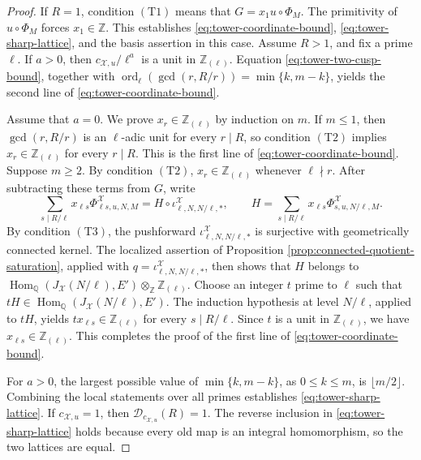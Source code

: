 \documentclass[12pt, letterpaper]{amsart}
\theoremstyle{definition}
\theoremstyle{remark}
\newcommand{\Q}{\mathbb Q}
\newcommand{\Z}{\mathbb Z}
\newcommand{\Hom}{\operatorname{Hom}}
\DeclareMathOperator{\ord}{ord}
\numberwithin{equation}{section}
\begin{document}
\begin{proof}
If \(R=1\), condition \hyperlink{tower-condition-T1}{\(\mathrm{(T1)}\)} means that \(G=x_1u\circ\Phi_M\). The
primitivity of \(u\circ\Phi_M\) forces \(x_1\in\Z\). This establishes
\eqref{eq:tower-coordinate-bound}, \eqref{eq:tower-sharp-lattice}, and the basis
assertion in this case. Assume \(R>1\), and fix a prime \(\ell\). If \(a>0\), then
\(c_{\mathcal X,u}/\ell^a\) is a unit in
\(\Z_{(\ell)}\). Equation \eqref{eq:tower-two-cusp-bound}, together with
\(\ord_\ell(\gcd(r,R/r))=\min\{k,m-k\}\), yields the second line of
\eqref{eq:tower-coordinate-bound}.

Assume that \(a=0\). We prove \(x_r\in\Z_{(\ell)}\) by induction on \(m\).
If \(m\le1\), then \(\gcd(r,R/r)\) is an \(\ell\)-adic unit for every
\(r\mid R\), so condition \hyperlink{tower-condition-T2}{\(\mathrm{(T2)}\)} implies
\(x_r\in\Z_{(\ell)}\) for every \(r\mid R\). This is the first line of
\eqref{eq:tower-coordinate-bound}. Suppose \(m\ge2\). By condition
\hyperlink{tower-condition-T2}{\(\mathrm{(T2)}\)},
\(x_r\in\Z_{(\ell)}\) whenever \(\ell\nmid r\). After subtracting these terms
from \(G\), write
\[
        \sum_{s\mid R/\ell}x_{\ell s}
        \Phi^{\mathcal X}_{\ell s,u,N,M}
        =
        H\circ\iota^{\mathcal X}_{\ell,N,N/\ell,*},
        \qquad
        H=
        \sum_{s\mid R/\ell}x_{\ell s}
        \Phi^{\mathcal X}_{s,u,N/\ell,M}.
\]
By condition \hyperlink{tower-condition-T3}{\(\mathrm{(T3)}\)}, the pushforward
\(\iota^{\mathcal X}_{\ell,N,N/\ell,*}\) is surjective with geometrically
connected kernel. The localized assertion of Proposition
\ref{prop:connected-quotient-saturation}, applied with
\(q=\iota^{\mathcal X}_{\ell,N,N/\ell,*}\), then shows that \(H\) belongs to
\(\Hom_\Q(J_{\mathcal X}(N/\ell),E')\otimes_\Z\Z_{(\ell)}\).
Choose an integer \(t\) prime to \(\ell\) such that
\(tH\in\Hom_\Q(J_{\mathcal X}(N/\ell),E')\). The induction hypothesis at level
\(N/\ell\), applied to \(tH\), yields
\(t x_{\ell s}\in\Z_{(\ell)}\) for every \(s\mid R/\ell\). Since \(t\) is a
unit in \(\Z_{(\ell)}\), we have \(x_{\ell s}\in\Z_{(\ell)}\). This
completes the proof of the first line of \eqref{eq:tower-coordinate-bound}.

For \(a>0\), the largest possible value of \(\min\{k,m-k\}\), as
\(0\le k\le m\), is \(\lfloor m/2\rfloor\). Combining the local statements
over all primes establishes \eqref{eq:tower-sharp-lattice}. If
\(c_{\mathcal X,u}=1\), then \(\mathcal D_{c_{\mathcal X,u}}(R)=1\). The reverse
inclusion in \eqref{eq:tower-sharp-lattice} holds because every old map is an
integral homomorphism, so the two lattices are equal.
\end{proof}
\end{document}
